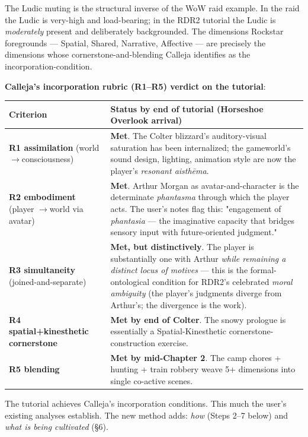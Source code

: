 \documentclass[11pt]{report}
\begin{document}
The Ludic muting is the structural inverse of the WoW raid example. In the raid the Ludic is very-high and load-bearing; in the RDR2 tutorial the Ludic is \textit{moderately} present and deliberately backgrounded. The dimensions Rockstar foregrounds — Spatial, Shared, Narrative, Affective — are precisely the dimensions whose cornerstone-and-blending Calleja identifies as the incorporation-condition.


\textbf{Calleja's incorporation rubric (R1–R5) verdict on the tutorial}:


\begin{table}[H]
\renewcommand{\arraystretch}{1.25}
\begin{tabularx}{\textwidth}{>{\RaggedRight\arraybackslash}X>{\RaggedRight\arraybackslash}X}
\toprule
Criterion & Status by end of tutorial (Horseshoe Overlook arrival) \\
\midrule
\textbf{R1 assimilation} (world $\rightarrow$\allowbreak  consciousness) & \textbf{Met}. The Colter blizzard's auditory-visual saturation has been internalized; the gameworld's sound design, lighting, animation style are now the player's \textit{resonant aisthēma}. \\
\textbf{R2 embodiment} (player $\rightarrow$\allowbreak  world via avatar) & \textbf{Met}. Arthur Morgan as avatar-and-character is the determinate \textit{phantasma} through which the player acts. The user's notes flag this: "engagement of \textit{phantasia} — the imaginative capacity that bridges sensory input with future-oriented judgment." \\
\textbf{R3 simultaneity} (joined-and-separate) & \textbf{Met, but distinctively}. The player is substantially one with Arthur \textit{while remaining a distinct locus of motives} — this is the formal-ontological condition for RDR2's celebrated \textit{moral ambiguity} (the player's judgments diverge from Arthur's; the divergence is the work). \\
\textbf{R4 spatial+kinesthetic cornerstone} & \textbf{Met by end of Colter}. The snowy prologue is essentially a Spatial-Kinesthetic cornerstone-construction exercise. \\
\textbf{R5 blending} & \textbf{Met by mid-Chapter 2}. The camp chores + hunting + train robbery weave 5+ dimensions into single co-active scenes. \\
\bottomrule
\end{tabularx}
\end{table}


The tutorial achieves Calleja's incorporation conditions. This much the user's existing analyses establish. The new method adds: \textit{how} (Steps 2–7 below) and \textit{what is being cultivated} (§6).
\end{document}
